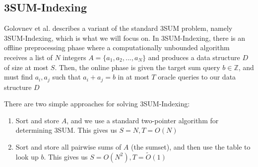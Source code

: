 \documentclass[12pt]{article}
\begin{document}
\subsection*{3SUM-Indexing}
Golovnev et al. describes a variant of the standard 3SUM problem, namely 3SUM-Indexing, which is what we will focus on. In 3SUM-Indexing, there is an offline preprocessing phase where a computationally unbounded algorithm receives a list of $N$ integers $A = \{a_1,a_2,...,a_N\}$ and produces a data structure $D$ of size at most $S$. Then, the online phase is given the target sum query $b \in \mathbb{Z}$, and must find $a_i,a_j$ such that $a_i + a_j = b$ in at most $T$ oracle queries to our data structure $D$

There are two simple approaches for solving 3SUM-Indexing:
\begin{enumerate}
    \item Sort and store $A$, and we use a standard two-pointer algorithm for determining 3SUM. This gives us $S=N, T = O(N)$
    \item Sort and store all pairwise sums of $A$ (the sumset), and then use the table to look up $b$. This gives us $S=O(N^2), T = \tilde{O}(1)$
\end{enumerate}
\end{document}
